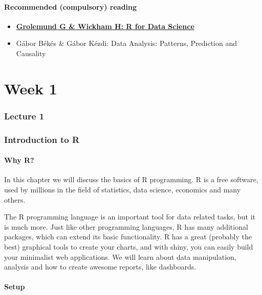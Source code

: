 \documentclass[
]{article}
\begin{document}
\hypertarget{recommended-compulsory-reading}{%
\subsection{Recommended (compulsory) reading}\label{recommended-compulsory-reading}}

\begin{itemize}
\item
  \href{http://r4ds.had.co.nz/}{\textbf{Grolemund G \& Wickham H:
  R for Data Science}}
\item
  Gábor Békés \& Gábor Kézdi: Data Analysis:
  Patterns, Prediction and Causality
\end{itemize}

\hypertarget{part-week-1}{%
\part*{Week 1}\label{part-week-1}}

\hypertarget{lecture1}{%
\section{Lecture 1}\label{lecture1}}

\hypertarget{seminar1}{%
\section{Introduction to R}\label{seminar1}}

\hypertarget{why-r}{%
\subsection{Why R?}\label{why-r}}

In this chapter we will discuss the basics of R programming.
R is a free software, used by millions in the field of statistics, data science, economics and many others.

The R programming language is an important tool for data related tasks, but it is much more.
Just like other programming languages, R has many additional packages, which can extend its basic functionality.
R has a great (probably the best) graphical tools to create your charts, and with shiny, you can easily build your minimalist web applications.
We will learn about data manipulation, analysis and how to create awesome reports, like dashboards.

\hypertarget{layout}{%
\subsection{Setup}\label{layout}}
\end{document}
